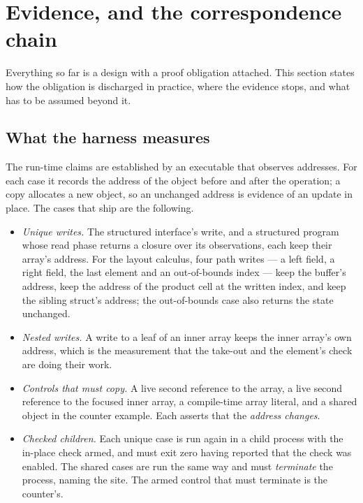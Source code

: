 \documentclass[11pt,a4paper]{article}
\theoremstyle{definition}
\theoremstyle{plain}
\begin{document}
\section{Evidence, and the correspondence chain}\label{sec:evidence}

Everything so far is a design with a proof obligation attached. This section
states how the obligation is discharged in practice, where the evidence stops,
and what has to be assumed beyond it.

\subsection{What the harness measures}

The run-time claims are established by an executable that observes addresses.
For each case it records the address of the object before and after the
operation; a copy allocates a new object, so an unchanged address is evidence of
an update in place. The cases that ship are the following.

\begin{itemize}[leftmargin=1.4em,itemsep=2pt]
\item \emph{Unique writes.} The structured interface's write, and a structured
program whose read phase returns a closure over its observations, each keep their
array's address. For the layout calculus, four path writes --- a left field, a
right field, the last element and an out-of-bounds index --- keep the buffer's
address, keep the address of the product cell at the written index, and keep the
sibling struct's address; the out-of-bounds case also returns the state
unchanged.
\item \emph{Nested writes.} A write to a leaf of an inner array keeps the inner
array's own address, which is the measurement that the take-out and the
element's check are doing their work.
\item \emph{Controls that must copy.} A live second reference to the array, a
live second reference to the focused inner array, a compile-time array literal,
and a shared object in the counter example. Each asserts that the \emph{address
changes}.
\item \emph{Checked children.} Each unique case is run again in a child process
with the in-place check armed, and must exit zero having reported that the check
was enabled. The shared cases are run the same way and must \emph{terminate} the
process, naming the site. The armed control that must terminate is the
counter's.
\end{itemize}
\end{document}
